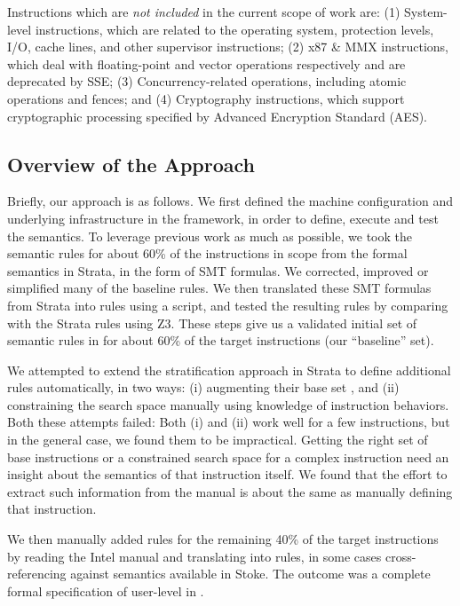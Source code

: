Instructions which are \emph{not included} in the current scope of work are: 
(1) System-level instructions, which are related to the operating system, 
protection levels, I/O, cache lines, and other supervisor instructions; 
(2) x87 \& MMX instructions, which deal with floating-point and vector 
operations respectively and are deprecated by SSE; 
(3) Concurrency-related operations, including atomic operations and fences; and 
(4) Cryptography instructions, which support cryptographic processing specified by Advanced Encryption Standard (AES).

\subsection{Overview of the Approach}
\label{sec:Approach:Overview}

Briefly, our approach is as follows.
%
We first defined the machine configuration and underlying infrastructure in the \K framework, in order to define, execute and test the \ISA semantics.
%
To leverage previous work as much as possible, we took the semantic rules for about 60\% of the instructions in scope from the formal semantics in Strata, in the form of SMT formulas.
%
We corrected, improved or simplified many of the baseline rules.
%
We then translated these SMT formulas from Strata into \K rules using a script, and tested the resulting rules by comparing with the Strata rules using Z3.
%
These steps give us a validated initial set of semantic rules in \K for about 60\% of the target instructions (our ``baseline'' set).

We attempted to extend the stratification approach in Strata to define additional rules automatically, in two ways: (i) augmenting their base set , and (ii) constraining the search space manually using knowledge of instruction behaviors.  Both these attempts failed: Both (i) and (ii) work well for a few instructions, but in the general case, we found them to be impractical.  Getting the right set of base instructions or a constrained search space for a complex instruction need an insight about the semantics of that instruction itself. We found that the effort to extract such information from the manual is about the same  as manually defining that instruction.


We then manually added \K rules for the remaining 40\% of the target instructions by reading the Intel manual and translating into \K rules, in some cases cross-referencing against semantics available in Stoke.
%
The outcome was a complete formal specification of user-level \ISA in \K.


